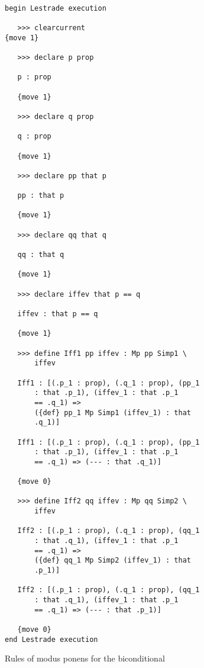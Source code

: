 \documentclass[12pt]{article}
\begin{document}
\begin{verbatim}

begin Lestrade execution

   >>> clearcurrent
{move 1}

   >>> declare p prop

   p : prop

   {move 1}

   >>> declare q prop

   q : prop

   {move 1}

   >>> declare pp that p

   pp : that p

   {move 1}

   >>> declare qq that q

   qq : that q

   {move 1}

   >>> declare iffev that p == q

   iffev : that p == q

   {move 1}

   >>> define Iff1 pp iffev : Mp pp Simp1 \
       iffev

   Iff1 : [(.p_1 : prop), (.q_1 : prop), (pp_1 
       : that .p_1), (iffev_1 : that .p_1 
       == .q_1) => 
       ({def} pp_1 Mp Simp1 (iffev_1) : that 
       .q_1)]

   Iff1 : [(.p_1 : prop), (.q_1 : prop), (pp_1 
       : that .p_1), (iffev_1 : that .p_1 
       == .q_1) => (--- : that .q_1)]

   {move 0}

   >>> define Iff2 qq iffev : Mp qq Simp2 \
       iffev

   Iff2 : [(.p_1 : prop), (.q_1 : prop), (qq_1 
       : that .q_1), (iffev_1 : that .p_1 
       == .q_1) => 
       ({def} qq_1 Mp Simp2 (iffev_1) : that 
       .p_1)]

   Iff2 : [(.p_1 : prop), (.q_1 : prop), (qq_1 
       : that .q_1), (iffev_1 : that .p_1 
       == .q_1) => (--- : that .p_1)]

   {move 0}
end Lestrade execution
\end{verbatim}

Rules of modus ponens for the biconditional
\end{document}
